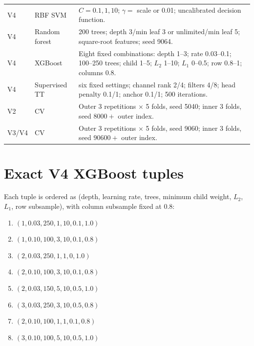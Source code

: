 \begin{longtable}{p{}p{}p{}}
V4 & RBF SVM & $C=0.1,1,10$; $\gamma=$ scale or 0.01; uncalibrated decision function.\\
V4 & Random forest & 200 trees; depth 3/min leaf 3 or unlimited/min leaf 5; square-root features; seed 9064.\\
V4 & XGBoost & Eight fixed combinations: depth 1--3; rate 0.03--0.1; 100--250 trees; child 1--5; $L_2$ 1--10; $L_1$ 0--0.5; row 0.8--1; columns 0.8.\\
V4 & Supervised TT & six fixed settings; channel rank 2/4; filters 4/8; head penalty 0.1/1; anchor 0.1/1; 500 iterations.\\
V2 & CV & Outer 3 repetitions $\times$ 5 folds, seed 5040; inner 3 folds, seed $8000+$ outer index.\\
V3/V4 & CV & Outer 3 repetitions $\times$ 5 folds, seed 9060; inner 3 folds, seed $90600+$ outer index.\\
\bottomrule
\end{longtable}

\section{Exact V4 XGBoost tuples}

Each tuple is ordered as (depth, learning rate, trees, minimum child weight,
$L_2$, $L_1$, row subsample), with column subsample fixed at 0.8:

\begin{enumerate}
  \item $(1,0.03,250,1,10,0.1,1.0)$
  \item $(1,0.10,100,3,10,0.1,0.8)$
  \item $(2,0.03,250,1,1,0,1.0)$
  \item $(2,0.10,100,3,10,0.1,0.8)$
  \item $(2,0.03,150,5,10,0.5,1.0)$
  \item $(3,0.03,250,3,10,0.5,0.8)$
  \item $(2,0.10,100,1,1,0.1,0.8)$
  \item $(3,0.10,100,5,10,0.5,1.0)$
\end{enumerate}

